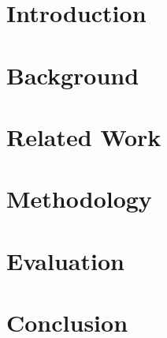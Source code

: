 \documentclass[acmengage]{acmart}
\begin{document}

\maketitle
\section{Introduction}

\section{Background}
\label{sec:background}

\section{Related Work}
\label{sec:relatedwork}

\section{Methodology}
\label{sec:methodology}

\section{Evaluation}
\label{sec:evaluation}

\section{Conclusion}
\label{sec:conclusion}




\end{document}
